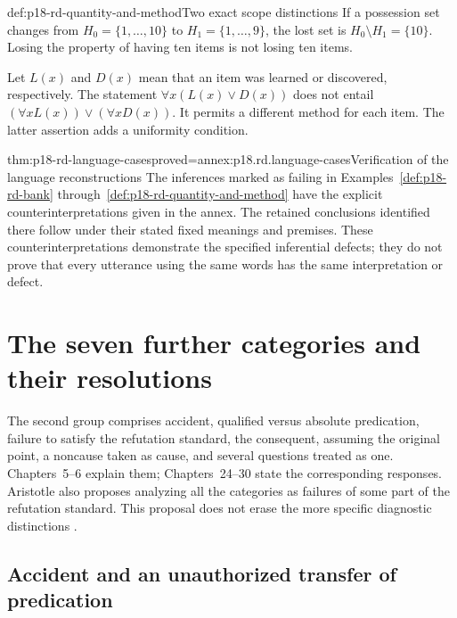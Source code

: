 \begin{hbexample}{def:p18-rd-quantity-and-method}{Two exact scope distinctions}
If a possession set changes from \(H_0=\{1,\ldots,10\}\) to
\(H_1=\{1,\ldots,9\}\), the lost set is
\(H_0\setminus H_1=\{10\}\). Losing the property of having
ten items is not losing ten items.

Let \(L(x)\) and \(D(x)\) mean that an item was learned or
discovered, respectively. The statement
\(\forall x(L(x)\lor D(x))\) does not entail
\((\forall x L(x))\lor(\forall x D(x))\). It permits a different
method for each item. The latter assertion adds a uniformity condition.
\end{hbexample}

\begin{hblemma}{thm:p18-rd-language-cases}{proved=annex:p18.rd.language-cases}{Verification of the language reconstructions}
The inferences marked as failing in Examples~\ref{def:p18-rd-bank}
through~\ref{def:p18-rd-quantity-and-method} have the explicit
counterinterpretations given in the annex. The retained conclusions
identified there follow under their stated fixed meanings and premises.
These counterinterpretations demonstrate the specified inferential
defects; they do not prove that every utterance using the same words
has the same interpretation or defect.
\end{hblemma}

\section{The seven further categories and their resolutions}
\label{sec:p18-rd-independent}

The second group comprises accident, qualified versus absolute
predication, failure to satisfy the refutation standard, the consequent,
assuming the original point, a noncause taken as cause, and several
questions treated as one. Chapters~5--6 explain them; Chapters~24--30
state the corresponding responses. Aristotle also proposes analyzing
all the categories as failures of some part of the refutation standard.
This proposal does not erase the more specific diagnostic distinctions
\cite[chaps.~5--6,24--30]{AristotleSophisticalRefutationsPickardCambridgeMIT}.

\subsection{Accident and an unauthorized transfer of predication}

